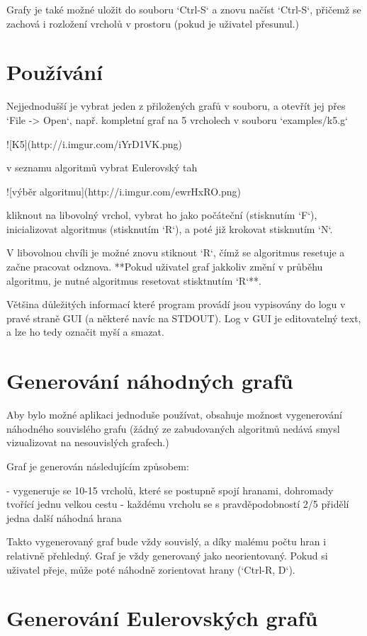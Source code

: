 \documentclass{article}
\begin{document}
Grafy je také možné uložit do souboru `Ctrl-S` a znovu načíst `Ctrl-S`,
přičemž se zachová i rozložení vrcholů v prostoru (pokud je uživatel
přesunul.)

\section{Používání}

Nejjednodušší je vybrat jeden z přiložených grafů v souboru, a otevřít
jej přes `File -> Open`, např. kompletní graf na 5 vrcholech v souboru
`examples/k5.g`

![K5](http://i.imgur.com/iYrD1VK.png)

v seznamu algoritmů vybrat Eulerovský tah

![výběr algoritmu](http://i.imgur.com/ewrHxRO.png)

kliknout na libovolný vrchol, vybrat ho jako počáteční (stisknutím `F`),
inicializovat algoritmus (stisknutím `R`), a poté již krokovat
stisknutím `N`.

V libovolnou chvíli je možné znovu stiknout `R`, čímž se algoritmus
resetuje a začne pracovat odznova. **Pokud uživatel graf jakkoliv změní
v průběhu algoritmu, je nutné algoritmus resetovat stisktnutím `R`**.

Většina důležitých informací které program provádí jsou vypisovány do
logu v pravé straně GUI (a některé navíc na STDOUT). Log v GUI je
editovatelný text, a lze ho tedy označit myší a smazat.

\section{Generování náhodných grafů}

Aby bylo možné aplikaci jednoduše používat, obsahuje možnost
vygenerování náhodného souvislého grafu (žádný ze zabudovaných algoritmů
nedává smysl vizualizovat na nesouvislých grafech.)

Graf je generován následujícím způsobem:

- vygeneruje se 10-15 vrcholů, které se postupně spojí hranami, dohromady tvořící jednu velkou cestu
- každému vrcholu se s pravděpodobností 2/5 přidělí jedna další náhodná hrana

Takto vygenerovaný graf bude vždy souvislý, a díky malému počtu hran i
relativně přehledný. Graf je vždy generovaný jako neorientovaný. Pokud
si uživatel přeje, může poté náhodně zorientovat hrany (`Ctrl-R, D`).

\section{Generování Eulerovských grafů}
\end{document}
